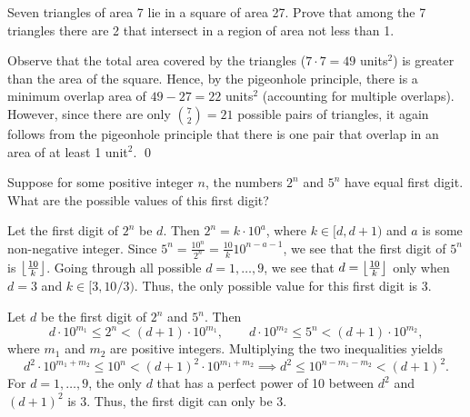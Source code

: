 \begin{question}\label{Q::2024-J-2-3}
    Seven triangles of area 7 lie in a square of area 27. Prove that among the 7 triangles there are 2 that intersect in a region of area not less than 1.
\end{question}
\begin{solution}
    Observe that the total area covered by the triangles ($7 \cdot 7 = 49$ units$^2$) is greater than the area of the square. Hence, by the pigeonhole principle, there is a minimum overlap area of $49 - 27 = 22$ units$^2$ (accounting for multiple overlaps). However, since there are only $\binom{7}{2} = 21$ possible pairs of triangles, it again follows from the pigeonhole principle that there is one pair that overlap in an area of at least 1 unit$^2$. \qed
\end{solution}

\begin{question}[3]\label{Q::2024-J-2-4}
    Suppose for some positive integer $n$, the numbers $2^n$ and $5^n$ have equal first digit. What are the possible values of this first digit?
\end{question}
\begin{solution}
    Let the first digit of $2^n$ be $d$. Then $2^n = k \cdot 10^a$, where $k \in [d, d+1)$ and $a$ is some non-negative integer. Since $5^n = \frac{10^n}{2^n} = \frac{10}{k} 10^{n-a-1}$, we see that the first digit of $5^n$ is $\left\lfloor \frac{10}{k} \right\rfloor$. Going through all possible $d = 1, \ldots, 9$, we see that $d = \left\lfloor \frac{10}{k} \right\rfloor$ only when $d = 3$ and $k \in [3, 10/3)$. Thus, the only possible value for this first digit is 3.
\end{solution}
\begin{solution}
    Let $d$ be the first digit of $2^n$ and $5^n$. Then \[d\cdot10^{m_1} \leq 2^n < (d+1) \cdot 10^{m_1}, \qquad d\cdot10^{m_2} \leq 5^n < (d+1) \cdot 10^{m_2},\]  where $m_1$ and $m_2$ are positive integers. Multiplying the two inequalities yields \[d^2 \cdot 10^{m_1 + m_2} \leq 10^n < (d+1)^2 \cdot 10^{m_1 + m_2} \implies d^2 \leq 10^{n - m_1 - m_2} < (d+1)^2.\] For $d = 1, \ldots, 9$, the only $d$ that has a perfect power of 10 between $d^2$ and $(d+1)^2$ is 3. Thus, the first digit can only be 3.
\end{solution}


